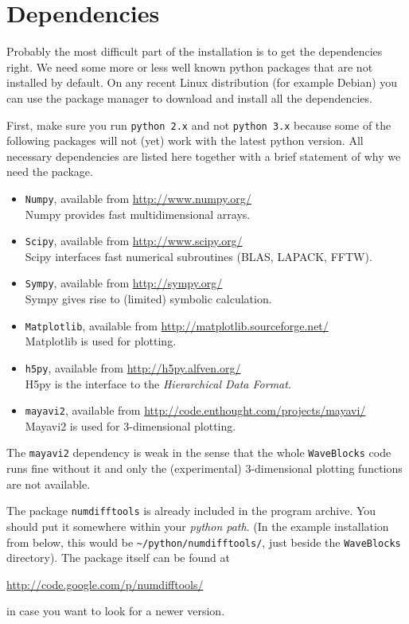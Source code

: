 \documentclass[a4paper,10pt]{report}
\begin{document}
\section{Dependencies}

Probably the most difficult part of the installation is to get the dependencies
right. We need some more or less well known python packages that are not installed
by default. On any recent Linux distribution (for example Debian) you can use the
package manager to download and install all the dependencies.

First, make sure you run \texttt{python 2.x} and not \texttt{python 3.x} because
some of the following packages will not (yet) work with the latest python version.
All necessary dependencies are listed here together with a brief statement of why we
need the package.

\begin{itemize}
  \item \texttt{Numpy}, available from \url{http://www.numpy.org/} \\
        Numpy provides fast multidimensional arrays.
  \item \texttt{Scipy}, available from \url{http://www.scipy.org/} \\
        Scipy interfaces fast numerical subroutines (BLAS, LAPACK, FFTW).
  \item \texttt{Sympy}, available from \url{http://sympy.org/} \\
        Sympy gives rise to (limited) symbolic calculation.
  \item \texttt{Matplotlib}, available from \url{http://matplotlib.sourceforge.net/} \\
        Matplotlib is used for plotting.
  \item \texttt{h5py}, available from \url{http://h5py.alfven.org/} \\
        H5py is the interface to the \emph{Hierarchical Data Format}.
  \item \texttt{mayavi2}, available from \url{http://code.enthought.com/projects/mayavi/} \\
        Mayavi2 is used for 3-dimensional plotting.
\end{itemize}

The \texttt{mayavi2} dependency is weak in the sense that the whole \texttt{WaveBlocks}
code runs fine without it and only the (experimental) 3-dimensional plotting functions
are not available.

The package \texttt{numdifftools} is already included in the program archive.
You should put it somewhere within your \emph{python path}. (In the example installation
from below, this would be \verb|~/python/numdifftools/|, just beside the
\texttt{WaveBlocks} directory). The package itself can be found at
\begin{center}
  \url{http://code.google.com/p/numdifftools/}
\end{center}
in case you want to look for a newer version.
\end{document}
